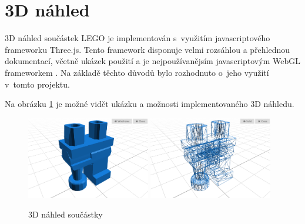 \section{3D náhled}
3D náhled součástek LEGO je implementován s~využitím javascriptového frameworku Three.js. Tento framework disponuje velmi rozsáhlou a přehlednou dokumentací, včetně ukázek použití a je nejpoužívanějsím javascriptovým WebGL frameworkem \autocite{webgl-comparison}. Na základě těchto důvodů bylo rozhodnuto o~jeho využití v~tomto projektu.





Na obrázku \ref{obrazek-modelviewer} je možné vidět ukázku a možnosti implementovaného 3D náhledu.

\begin{figure}[htbp]
        \centering
        \includegraphics[width=0.48\textwidth,height=\textheight,keepaspectratio]{images/model-viewer-solid.png}
        \includegraphics[width=0.48\textwidth,height=\textheight,keepaspectratio]{images/model-viewer-wireframe.png}
        \caption{3D náhled součástky \label{obrazek-modelviewer}}
\end{figure}